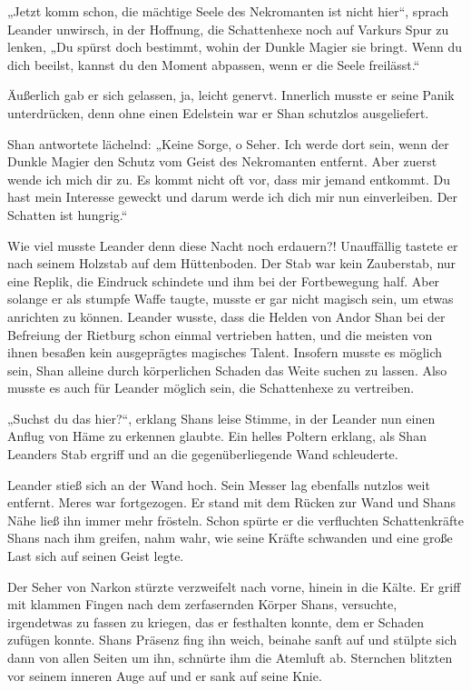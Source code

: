 \documentclass[10pt, a4paper, oneside]{book}
\begin{document}
„Jetzt komm schon, die mächtige Seele des Nekromanten ist nicht hier“, sprach Leander unwirsch, in der Hoffnung, die Schattenhexe noch auf Varkurs Spur zu lenken, „Du spürst doch bestimmt, wohin der Dunkle Magier sie bringt. Wenn du dich beeilst, kannst du den Moment abpassen, wenn er die Seele freilässt.“

Äußerlich gab er sich gelassen, ja, leicht genervt. Innerlich musste er seine Panik unterdrücken, denn ohne einen Edelstein war er Shan schutzlos ausgeliefert.

Shan antwortete lächelnd: „Keine Sorge, o Seher. Ich werde dort sein, wenn der Dunkle Magier den Schutz vom Geist des Nekromanten entfernt. Aber zuerst wende ich mich dir zu. Es kommt nicht oft vor, dass mir jemand entkommt. Du hast mein Interesse geweckt und darum werde ich dich mir nun einverleiben. Der Schatten ist hungrig.“

Wie viel musste Leander denn diese Nacht noch erdauern?! Unauffällig tastete er nach seinem Holzstab auf dem Hüttenboden. Der Stab war kein Zauberstab, nur eine Replik, die Eindruck schindete und ihm bei der Fortbewegung half. Aber solange er als stumpfe Waffe taugte, musste er gar nicht magisch sein, um etwas anrichten zu können. Leander wusste, dass die Helden von Andor Shan bei der Befreiung der Rietburg schon einmal vertrieben hatten, und die meisten von ihnen besaßen kein ausgeprägtes magisches Talent. Insofern musste es möglich sein, Shan alleine durch körperlichen Schaden das Weite suchen zu lassen. Also musste es auch für Leander möglich sein, die Schattenhexe zu vertreiben.

„Suchst du das hier?“, erklang Shans leise Stimme, in der Leander nun einen Anflug von Häme zu erkennen glaubte. Ein helles Poltern erklang, als Shan Leanders Stab ergriff und an die gegenüberliegende Wand schleuderte.

Leander stieß sich an der Wand hoch. Sein Messer lag ebenfalls nutzlos weit entfernt. Meres war fortgezogen. Er stand mit dem Rücken zur Wand und Shans Nähe ließ ihn immer mehr frösteln. Schon spürte er die verfluchten Schattenkräfte Shans nach ihm greifen, nahm wahr, wie seine Kräfte schwanden und eine große Last sich auf seinen Geist legte.

Der Seher von Narkon stürzte verzweifelt nach vorne, hinein in die Kälte. Er griff mit klammen Fingen nach dem zerfasernden Körper Shans, versuchte, irgendetwas zu fassen zu kriegen, das er festhalten konnte, dem er Schaden zufügen konnte. Shans Präsenz fing ihn weich, beinahe sanft auf und stülpte sich dann von allen Seiten um ihn, schnürte ihm die Atemluft ab. Sternchen blitzten vor seinem inneren Auge auf und er sank auf seine Knie.
\end{document}
